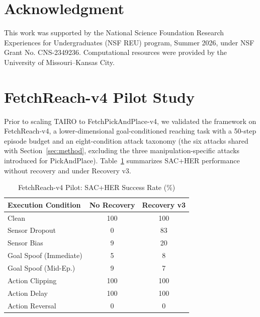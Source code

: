 \documentclass[conference]{IEEEtran}
\begin{document}
\section*{Acknowledgment}
This work was supported by the National Science Foundation Research Experiences for Undergraduates (NSF REU) program, Summer 2026, under NSF Grant No. CNS-2349236. Computational resources were provided by the University of Missouri--Kansas City.


\appendix
\section{FetchReach-v4 Pilot Study}
\label{app:fetchreach}

Prior to scaling TAIRO to FetchPickAndPlace-v4, we validated the framework on
FetchReach-v4, a lower-dimensional goal-conditioned reaching task with a 50-step
episode budget and an eight-condition attack taxonomy (the six attacks shared with
Section~\ref{sec:method}, excluding the three manipulation-specific attacks introduced
for PickAndPlace). Table~\ref{tab:fetchreach_pilot} summarizes SAC+HER performance
without recovery and under Recovery v3.

\begin{table}[htbp]
\caption{FetchReach-v4 Pilot: SAC+HER Success Rate (\%)}
\label{tab:fetchreach_pilot}
\begin{center}
\begin{tabular}{lcc}
\toprule
\textbf{Execution Condition} & \textbf{No Recovery} & \textbf{Recovery v3} \\
\midrule
Clean                   & 100 & 100 \\
Sensor Dropout          &   0 &  83 \\
Sensor Bias             &   9 &  20 \\
Goal Spoof (Immediate)  &   5 &   8 \\
Goal Spoof (Mid-Ep.)    &   9 &   7 \\
Action Clipping         & 100 & 100 \\
Action Delay            & 100 & 100 \\
Action Reversal         &   0 &   0 \\
\bottomrule
\end{tabular}
\end{center}
\end{table}
\end{document}
